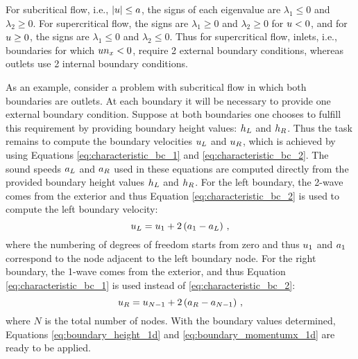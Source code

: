 For subcritical flow, i.e., $|u|\leq a$,
the signs of each eigenvalue are $\lambda_1\leq 0$ and $\lambda_2\geq 0$.
For supercritical flow, the signs are $\lambda_1\geq 0$
and $\lambda_2\geq 0$ for $u<0$, and for $u\geq 0$,
the signs are $\lambda_1\leq 0$ and $\lambda_2\leq 0$. Thus for supercritical
flow, inlets, i.e., boundaries for which $un_x<0$, require
2 external boundary conditions, whereas outlets use 2 internal boundary
conditions.

As an example, consider a problem with subcritical flow in which both
boundaries are outlets. At each boundary it will be necessary to provide one
external boundary condition. Suppose at both boundaries one chooses to fulfill
this requirement by providing boundary height values: $h_L$ and $h_R$.
Thus the task remains to compute the boundary velocities
$u_L$ and $u_R$, which is achieved by using Equations
\eqref{eq:characteristic_bc_1} and \eqref{eq:characteristic_bc_2}.
The sound speeds $a_L$ and $a_R$ used in these
equations are computed directly from the provided boundary height values
$h_L$ and $h_R$.
For the left boundary, the 2-wave comes from the exterior and thus Equation
\eqref{eq:characteristic_bc_2} is used to compute the left boundary
velocity:
\begin{equation}
  u_L
  = u_1 + 2\left(a_1 - a_L\right) \,,
\end{equation}
where the numbering of degrees of freedom starts from zero and
thus $u_1$ and $a_1$ correspond to the node
adjacent to the left boundary node.
For the right boundary, the 1-wave comes from the exterior, and
thus Equation \eqref{eq:characteristic_bc_1} is used instead of
\eqref{eq:characteristic_bc_2}:
\begin{equation}
  u_R
  = u_{N-1} + 2\left(a_R - a_{N-1}\right) \,,
\end{equation}
where $N$ is the total number of nodes.
With the boundary values determined, Equations \eqref{eq:boundary_height_1d}
and \eqref{eq:boundary_momentumx_1d} are ready to be applied.

